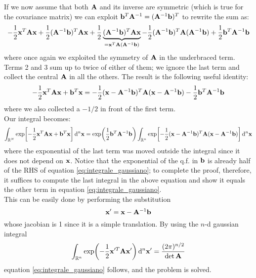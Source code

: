 \documentclass[a4paper]{article}
\newcommand{\R}{\mathbb{R}}
\newcommand{\mat}[1]{\vb{#1}}
\begin{document}
If we now assume that both $\mat{A}$ and its inverse are symmetric (which is true for the covariance matrix) we can exploit $\vb{b}^T \mat{A}^{-1} = (\mat{A}^{-1}\vb{b})^T$ to rewrite the sum as:
\begin{equation*}
    -\frac{1}{2}\vb{x}^T\mat{A}\vb{x} +  \frac{1}{2}(\mat{A}^{-1}\vb{b})^T \mat{A}\vb{x}+\frac{1}{2}\underbrace{(\mat{A}^{-1}\vb{b})^T\mat{A}\vb{x}}_{= \vb{x}^T\mat{A}(\mat{A}^{-1}\vb{b})} - \frac{1}{2}(\mat{A}^{-1}\vb{b})^T\mat{A}(\mat{A}^{-1}\vb{b}) +\frac{1}{2} \vb{b}^T\mat{A}^{-1}\vb{b}
\end{equation*}
where once again we exploited the symmetry of $\mat{A}$ in the underbraced term.
Terms 2 and 3 sum up to twice of either of them; we ignore the last term and collect the central $\mat{A}$ in all the others. The result is the following useful identity:
\begin{equation*}
    -\frac{1}{2}\vb{x}^T\mat{A}\vb{x} +\vb{b}^T \vb{x} = -\frac{1}{2}(\vb{x} - \mat{A}^{-1}\vb{b})^T \mat{A}(\vb{x} - \mat{A}^{-1}\vb{b}) -\frac{1}{2} \vb{b}^T\mat{A}^{-1}\vb{b}
\end{equation*}
where we also collected a $-1/2$ in front of the first term.\\
Our integral becomes:
\begin{equation*}
    \int_{\R^N} \exp[-\frac{1}{2}\vb{x}^T\mat{A}\vb{x} +\vb{b}^T \vb{x}] \dd[n]{\vb{x}} = \exp(\frac{1}{2}\vb{b}^T \mat{A}^{-1}\vb{b})\int_{\R^n} \exp[-\frac{1}{2}(\vb{x} - \mat{A}^{-1}\vb{b})^T \mat{A}(\vb{x} - \mat{A}^{-1}\vb{b})]\dd[n]{\vb{x}}
\end{equation*}
where the exponential of the last term was moved outside the integral since it does not depend on $\vb{x}$.
Notice that the exponential of the q.f. in $\vb{b}$ is already half of the RHS of equation \eqref{eq:integrale_gaussiano}; to complete the proof, therefore, it suffices to compute the last integral in the above equation and show it equals the other term in equation \eqref{eq:integrale_gaussiano}.\\      
This can be easily done by performing the substitution
\begin{equation*}
    \vb{x}' = \vb{x} - \mat{A}^{-1}\vb{b}
\end{equation*}
whose jacobian is 1 since it is a simple translation. By using the $n$-d gaussian integral
\begin{equation}
    \label{eq:integrale_gaussiano_no_termine_lineare}
    \int_{\R^n}\exp(-\frac{1}{2}\vb{x}'^T\mat{A}\vb{x}')\dd[n]{\vb{x}'} = \frac{(2\pi)^{n/2}}{\det\mat{A}}
\end{equation}
equation \eqref{eq:integrale_gaussiano} follows, and the problem is solved.
\end{document}
